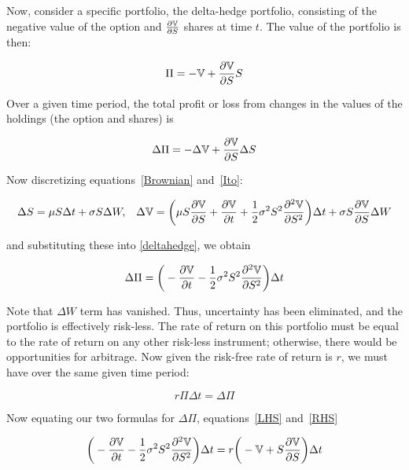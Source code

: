 Now, consider a specific portfolio, the delta-hedge portfolio, consisting of the negative value of the option and \(\frac{\partial \mathbb{V}}{\partial S} \) shares at time \(t \). The value of the portfolio is then:

\begin{equation*}
    \Pi = -\mathbb{V} + \frac{\partial \mathbb{V}}{\partial S}S
\end{equation*}

Over a given time period, the total profit or loss from changes in the values of the holdings (the option and shares) is

\begin{equation}\label{deltahedge}
    \Delta \Pi = -\Delta \mathbb{V} + \frac{\partial \mathbb{V}}{\partial S}\Delta S
\end{equation}

Now discretizing equations~\eqref{Brownian} and~\eqref{Ito}:

\begin{align*}
    \Delta S &= \mu S \Delta t + \sigma S \Delta W , & \Delta \mathbb{V} = \bigg(\mu S \frac{\partial \mathbb{V}}{\partial S} + \frac{\partial \mathbb{V}}{\partial t} + \frac{1}{2}\sigma^2S^2\frac{\partial^2\mathbb{V}}{\partial S^2}\bigg)\Delta t + \sigma S \frac{\partial \mathbb{V}}{\partial S} \Delta W
\end{align*}

and substituting these into \autoref{deltahedge}, we obtain

\begin{equation}\label{LHS}
    \Delta \Pi = \bigg(-\frac{\partial \mathbb{V}}{\partial t} - \frac{1}{2}\sigma^2S^2\frac{\partial^2\mathbb{V}}{\partial S^2}\bigg)\Delta t
\end{equation}

Note that \(\Delta W \) term has vanished. Thus, uncertainty has been eliminated, and the portfolio is effectively risk-less. The rate of return on this portfolio must be equal to the rate of return on any other risk-less instrument; otherwise, there would be opportunities for arbitrage. Now given the risk-free rate of return is \(r \), we must have over the same given time period:

\begin{equation}\label{RHS}
    r\Pi \Delta t = \Delta \Pi
\end{equation}

Now equating our two formulas for \(\Delta \Pi \), equations~\eqref{LHS} and~\eqref{RHS}

\begin{equation*}
    \bigg(-\frac{\partial \mathbb{V}}{\partial t} - \frac{1}{2}\sigma^2S^2\frac{\partial^2\mathbb{V}}{\partial S^2}\bigg)\Delta t = r\bigg(-\mathbb{V}+S\frac{\partial \mathbb{V}}{\partial S}\bigg)\Delta t
\end{equation*}


